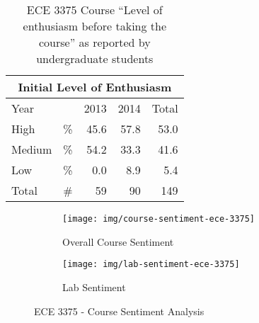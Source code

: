 \begin{table}[!h]
    \centering
    \begin{tabular}{lc|r|r|r}
        \multicolumn{5}{c}{Initial Level of Enthusiasm} \\ \hline\hline
        \multicolumn{2}{l}{Year} & \multicolumn{1}{|c}{2013} & \multicolumn{1}{|c}{2014} & \multicolumn{1}{|c}{Total} \\ \hline
        High          & \%       & 45.6                     & 57.8                     & 53.0                      \\ 
        Medium        & \%       & 54.2                     & 33.3                     & 41.6                      \\
        Low           & \%       & 0.0                      & 8.9                      & 5.4                       \\ 
        Total         & \#       & 59                       & 90                       & 149                       \\ \hline
    \end{tabular}
    \caption{ECE 3375 Course ``Level of enthusiasm before taking the course'' as reported by undergraduate students\cite{evals:ece3375-2013, evals:ece3375-2014}} 
    \label{table-course-enthusiasm-ece3375}
\end{table}

\begin{figure}
    \centering
    \begin{subfigure}{.8\linewidth}
       \centering
       \texttt{[image: img/course-sentiment-ece-3375]}
       \caption{Overall Course Sentiment}
       \label{fig:ece-3375-course-sentiment}
    \end{subfigure}
   
    \begin{subfigure}{.8\linewidth}
       \centering
       \texttt{[image: img/lab-sentiment-ece-3375]}
       \caption{Lab Sentiment}
       \label{fig:ece-3375-lab-sentiment}
    \end{subfigure}

    \caption{ECE 3375 - Course Sentiment Analysis\cite{evals:ece3375-2013, evals:ece3375-2014}}
\end{figure}

